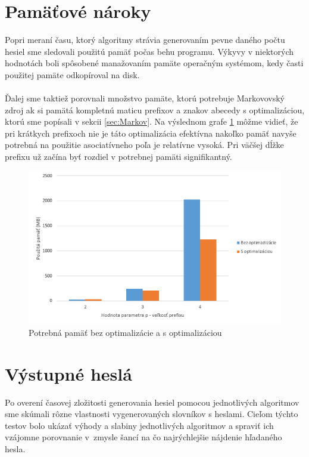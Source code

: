 \section{Pamäťové nároky}
Popri meraní času, ktorý algoritmy strávia generovaním pevne daného počtu hesiel sme sledovali použitú pamäť počas behu programu. Výkyvy v niektorých hodnotách boli spôsobené manažovaním pamäte operačným systémom, kedy časti použitej pamäte odkopíroval na disk.

\paragraph{}
Ďalej sme taktiež porovnali množstvo pamäte, ktorú potrebuje Markovovský zdroj ak si pamätá kompletnú maticu prefixov a znakov abecedy s optimalizáciou, ktorú sme popísali v sekcii \ref{sec:Markov}. Na výslednom grafe \ref{fig:memOptimization} môžme vidieť, že pri krátkych prefixoch nie je táto optimalizácia efektívna nakoľko pamäť navyše potrebná na použitie asociatívneho poľa je relatívne vysoká. Pri väčšej dĺžke prefixu už začína byť rozdiel v potrebnej pamäti signifikantný.

\begin{figure}[ht]
    \centering
    \includegraphics[width=1\textwidth]{memOptimize}
    \caption{Potrebná pamäť bez optimalizácie a s optimalizáciou}
    \label{fig:memOptimization}
\end{figure}

\section{Výstupné heslá}
\label{sec:pass}
Po overení časovej zložitosti generovania hesiel pomocou jednotlivých algoritmov sme skúmali rôzne vlastnosti vygenerovaných slovníkov s heslami. Cieľom týchto testov bolo ukázať výhody a slabiny jednotlivých algoritmov a spraviť ich vzájomne porovnanie v~zmysle šancí na čo najrýchlejšie nájdenie hľadaného hesla.

